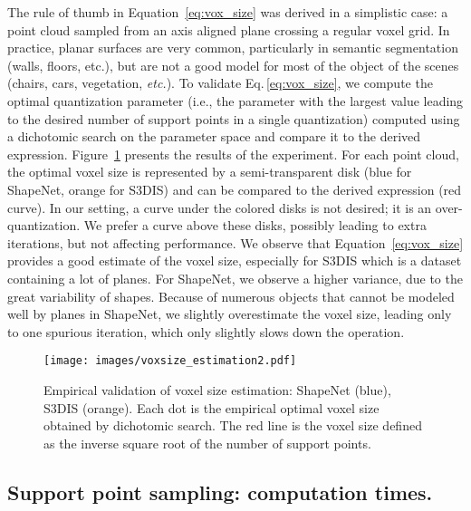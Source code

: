 The rule of thumb in Equation~\eqref{eq:vox_size} was derived in a simplistic case: a point cloud sampled from an axis aligned plane crossing a regular voxel grid.
In practice, planar surfaces are very common, particularly in semantic segmentation (walls, floors, etc.), but are not a good model for most of the object of the scenes (chairs, cars, vegetation, \emph{etc.}).
To validate Eq.\,\eqref{eq:vox_size}, we compute the optimal quantization parameter (i.e., the parameter with the largest value leading to the desired number of support points in a single quantization) computed using a dichotomic search on the parameter space and compare it to the derived expression. Figure~\ref{fig:voxsize} presents the results of the experiment.
For each point cloud, the optimal voxel size is represented by a semi-transparent disk (blue for ShapeNet, orange for S3DIS) and can be compared to the derived expression (red curve).
In our setting, a curve under the colored disks is not desired; it is an over-quantization.
We prefer a curve above these disks, possibly leading to extra iterations, but not affecting performance.
We observe that Equation~\eqref{eq:vox_size} provides a good estimate of the voxel size, especially for S3DIS which is a dataset containing a lot of planes.
For ShapeNet, we observe a higher variance, due to the great variability of shapes.
Because of numerous objects that cannot be modeled well by planes in ShapeNet, we slightly overestimate the voxel size, leading only to one spurious iteration, which only slightly slows down the operation.

\begin{figure}[t]
    \centering
    \texttt{[image: images/voxsize\_estimation2.pdf]}
    \caption{Empirical validation of voxel size estimation: ShapeNet (blue), S3DIS (orange). Each dot is the empirical optimal voxel size obtained by dichotomic search. The red line is the voxel size defined as the inverse square root of the number of support points.}
    \label{fig:voxsize}
\end{figure}



\subsection{Support point sampling: computation times.}


